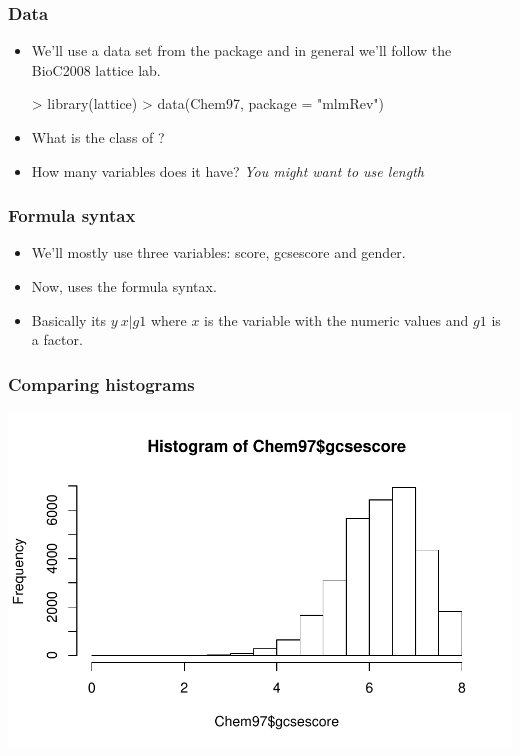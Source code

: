\begin{frame}
  \frametitle{Data}
  \begin{itemize}
  \item We'll use a data set from the  package and in general we'll follow the BioC2008 lattice lab.
\begin{Schunk}
\begin{Sinput}
> library(lattice)
> data(Chem97, package = "mlmRev")
\end{Sinput}
\end{Schunk}
  \item What is the class of ?
  \item How many variables does it have? \emph{You might want to use length}
  \end{itemize}
\end{frame}

\begin{frame}[allowframebreaks]
  \frametitle{Formula syntax}
  \begin{itemize}
  \item We'll mostly use three variables: score, gcsescore and gender. 
  \item Now,  uses the \alert{formula} syntax.
  \item Basically its $y ~ x | g1$ where $x$ is the variable with the numeric values and $g1$ is a factor.
  \end{itemize}
\end{frame}

\begin{frame}
  \frametitle{Comparing histograms}
\begin{Schunk}
\end{Schunk}
\includegraphics{plots/fig-007}
\end{frame}

